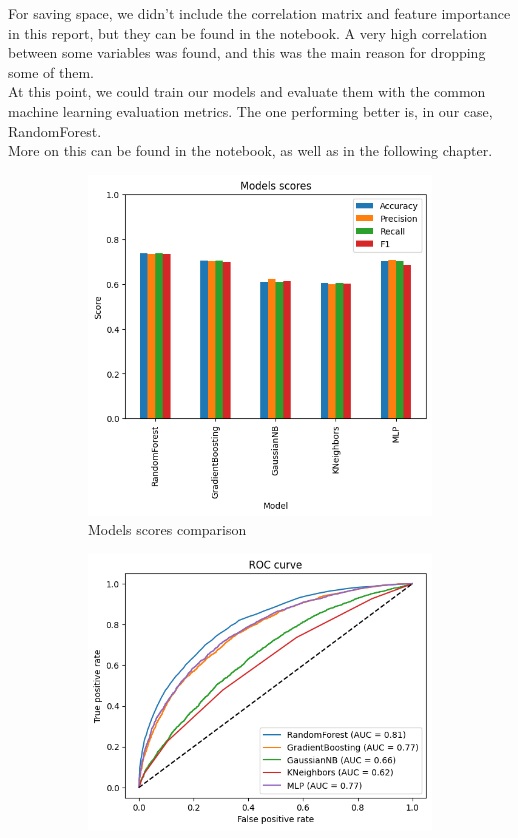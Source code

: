 For saving space, we didn't include the correlation matrix and feature importance in this report, but they can be found in the notebook. A very high correlation between 
some variables was found, and this was the main reason for dropping some of them.\\
At this point, we could train our models and evaluate them with the common machine learning evaluation metrics. The one performing better is, in our case, RandomForest.\\More on this can be found in the notebook, as well as in the following chapter.

\begin{figure}[H]
  \centering
  \begin{subfigure}{0.45\textwidth}
    \centering
    \includegraphics[width=\textwidth]{images/models_scores.png}
    \caption{Models scores comparison}
    \label{fig:immagine1}
  \end{subfigure}
  \hfill
  \begin{subfigure}{0.45\textwidth}
    \centering
    \includegraphics[width=\textwidth]{images/roc_curves.png}

\end{subfigure}
\end{figure}

